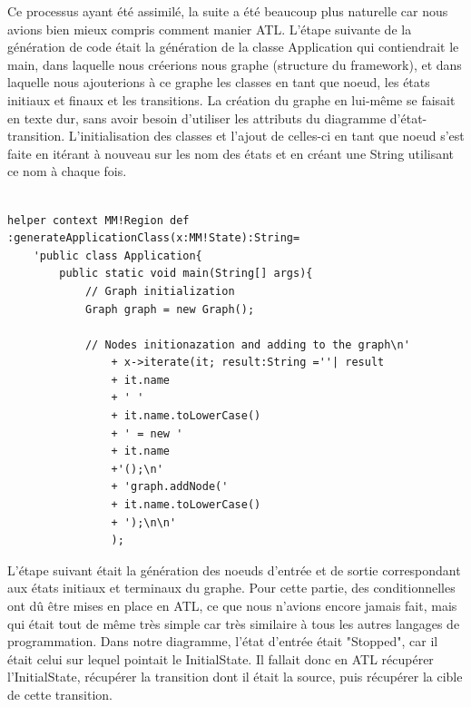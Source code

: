 \documentclass[french, 12pt, a4paper]{article}
\begin{document}
    Ce processus ayant été assimilé, la suite a été beaucoup plus naturelle car nous avions bien mieux compris comment manier ATL. 
    L'étape suivante de la génération de code était la génération de la classe Application qui contiendrait le main, dans laquelle nous créerions nous graphe (structure du framework), et dans laquelle nous ajouterions à ce graphe les classes en tant que noeud, les états initiaux et finaux et les transitions.
    La création du graphe en lui-même se faisait en texte dur, sans avoir besoin d'utiliser les attributs du diagramme d'état-transition. 
    L'initialisation des classes et l'ajout de celles-ci en tant que noeud s'est faite en itérant à nouveau sur les nom des états et en créant une String utilisant ce nom à chaque fois. 
    
      \begin{lstlisting}[caption={Création de l'arbre et des classes et ajout des noeuds dans l'arbre.},basicstyle=\small]

helper context MM!Region def :generateApplicationClass(x:MM!State):String=
	'public class Application{
        public static void main(String[] args){
            // Graph initialization
            Graph graph = new Graph();
        
            // Nodes initionazation and adding to the graph\n'
        	    + x->iterate(it; result:String =''| result
        		+ it.name
        		+ ' '
        		+ it.name.toLowerCase()
        		+ ' = new '
        		+ it.name
        		+'();\n'
        		+ 'graph.addNode('
        		+ it.name.toLowerCase()
        		+ ');\n\n'
	            );

    \end{lstlisting}
    
L'étape suivant était la génération des noeuds d'entrée et de sortie correspondant aux états initiaux et terminaux du graphe. Pour cette partie, des conditionnelles ont dû être mises en place en ATL, ce que nous n'avions encore jamais fait, mais qui était tout de même très simple car très similaire à tous les autres langages de programmation.
Dans notre diagramme, l'état d'entrée était "Stopped", car il était celui sur lequel pointait le InitialState. Il fallait donc en ATL récupérer l'InitialState, récupérer la transition dont il était la source, puis récupérer la cible de cette transition. 
\end{document}
